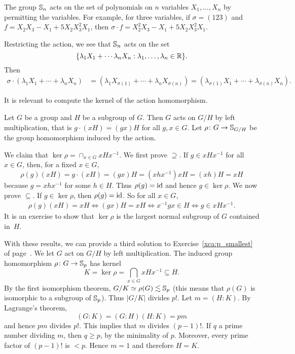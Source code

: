\begin{example}
    The group $\mathbb{S}_n$ acts on the set of polynomials on
    $n$ variables $X_1,\dots,X_n$
    by permitting the variables. For example, for three variables, if 
    $\sigma=(123)$ and $f=X_2X_3-X_1+5X_2X_3^2X_1$, then 
    $\sigma\cdot f=X_2^2X_3-X_1+5X_2X_3^2X_1$.

    Restricting the action, we see that 
    $\mathbb{S}_n$ acts on the set 
    \[
    \{\lambda_1X_1+\cdots\lambda_nX_n:\lambda_1,\dots,\lambda_n\in\mathbb{R}\}.
    \]
    Then 
    \begin{align*}
    \sigma \cdot (\lambda_1X_1+\cdots+\lambda_nX_n) &= (\lambda_1X_{\sigma(1)}+\cdots+\lambda_nX_{\sigma(n)})
    =(\lambda_{\sigma(1)}X_1+\cdots+\lambda_{\sigma(n)}X_n).
    \end{align*}
\end{example}

It is relevant to compute the kernel of the action homomorphism. 

\begin{example}
Let $G$ be a group and $H$ be a subgroup of $G$. Then $G$ 
acts on $G/H$ by left multiplication, that is 
$g\cdot (xH)=(gx)H$ for all $g,x\in G$. Let $\rho\colon G\to\mathbb{S}_{G/H}$ be the group homomorphism induced by the action. 

We claim that $\ker\rho=\cap_{x\in G}xHx^{-1}$. 
We first prove $\supseteq$. If $g\in xHx^{-1}$ for all 
$x\in G$, then, for a fixed $x\in G$,
 \[
 \rho(g)(xH)=g\cdot (xH)=(gx)H=(xhx^{-1})xH=(xh)H=xH
 \]
because $g=xhx^{-1}$ for some $h\in H$. Thus $\rho(g)=\operatorname{id}$ 
and hence $g\in\ker\rho$. We now prove 
$\subseteq$. If $g\in\ker\rho$, then
 $\rho(g)=\operatorname{id}$. So for all $x\in G$,
 \begin{align*}
\rho(g)(xH)=xH
\Longleftrightarrow (gx)H=xH
\Longleftrightarrow x^{-1}gx\in H
\Longleftrightarrow g\in xHx^{-1}.
 \end{align*}
It is an exercise to show that
$\ker\rho$ is the largest normal subgroup of $G$ 
contained in~$H$.
\end{example}

With these results, we can provide a third 
solution to Exercise~\ref{xca:p_smallest} of 
page~\pageref{xca:p_smallest}.
We let  $G$ act on $G/H$ by left multiplication. 
The induced group homomorphism  $\rho\colon G\to\mathbb{S}_p$ has 
kernel 
\[
K=\ker\rho=\bigcap_{x\in G}xHx^{-1}\subseteq H.
\]
By the first isomorphism theorem, 
$G/K\simeq\rho(G)\lesssim\mathbb{S}_p$ (this means that 
$\rho(G)$ is isomorphic to a subgroup of $\mathbb{S}_p$). 
Thus $|G/K|$ divides $p!$.
Let $m=(H:K)$. By Lagrange's theorem,
\[
(G:K)=(G:H)(H:K)=pm
\]
and hence $pm$ divides $p!$. This implies that $m$ divides $(p-1)!$. If $q$ a prime number dividing 
 $m$, then $q\geq p$, by the minimality of $p$. Moreover, 
 every prime factor of $(p-1)!$ is 
 $<p$. Hence $m=1$ and therefore $H=K$.

